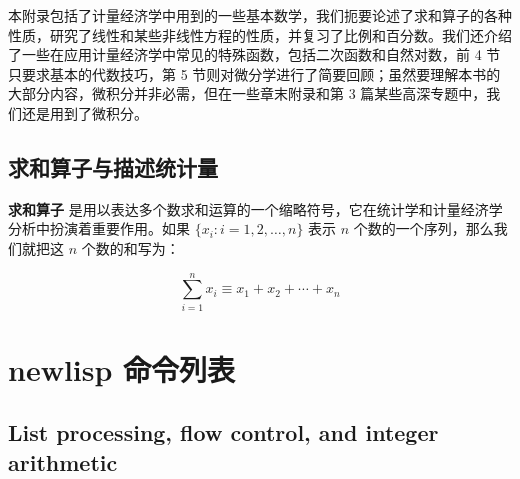 \documentclass[cn,11pt]{elegantbook}
\begin{document}
本附录包括了计量经济学中用到的一些基本数学，我们扼要论述了求和算子的各种性质，研究了线性和某些非线性方程的性质，并复习了比例和百分数。我们还介绍了一些在应用计量经济学中常见的特殊函数，包括二次函数和自然对数，前 4 节只要求基本的代数技巧，第 5 节则对微分学进行了简要回顾；虽然要理解本书的大部分内容，微积分并非必需，但在一些章末附录和第 3 篇某些高深专题中，我们还是用到了微积分。

\section{求和算子与描述统计量}

\textbf{求和算子} 是用以表达多个数求和运算的一个缩略符号，它在统计学和计量经济学分析中扮演着重要作用。如果 $\{x_i: i=1, 2, \ldots, n\}$ 表示 $n$ 个数的一个序列，那么我们就把这 $n$ 个数的和写为：

\begin{equation}
\sum_{i=1}^n x_i \equiv x_1 + x_2 +\cdots + x_n
\end{equation}


\chapter{newlisp 命令列表}


\section{List processing, flow control, and integer arithmetic}
\end{document}
